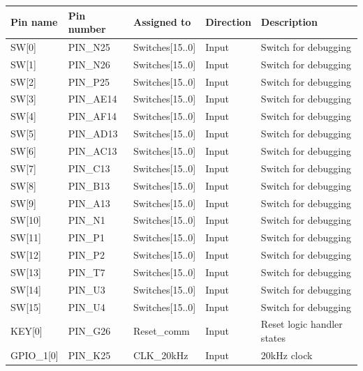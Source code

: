 \begin{table}[H]
	\begin{tabular}{|l|l|l|l|l|}
    	\hline
    	\textbf{Pin name} 	& \textbf{Pin number}& \textbf{Assigned to} 		&  \textbf{Direction} 	 & \textbf{Description} \\ \hline
    	SW[0]    	& PIN\_N25 	& Switches[15..0] 	& Input        	 & Switch for debugging           \\ \hline
    	SW[1]    	& PIN\_N26 	& Switches[15..0] 	& Input     	 & Switch for debugging    \\ \hline
    	SW[2]	 	& PIN\_P25 	& Switches[15..0] 	& Input			 & Switch for debugging  \\ \hline
    	SW[3]	 	& PIN\_AE14 & Switches[15..0] 	& Input			 & Switch for debugging \\ \hline
    	SW[4]	 	& PIN\_AF14 & Switches[15..0] 	& Input			 & Switch for debugging \\ \hline
    	SW[5]	 	& PIN\_AD13 & Switches[15..0] 	& Input			 & Switch for debugging           \\ \hline
    	SW[6]	 	& PIN\_AC13 & Switches[15..0] 	& Input			 & Switch for debugging           \\ \hline
    	SW[7]	 	& PIN\_C13 	& Switches[15..0] 	& Input			 & Switch for debugging		\\ \hline
    	SW[8]	 	& PIN\_B13 	& Switches[15..0] 	& Input			 & Switch for debugging		\\ \hline
   		SW[9]	 	& PIN\_A13 	& Switches[15..0] 	& Input			 & Switch for debugging \\ \hline
   		SW[10]	 	& PIN\_N1 	& Switches[15..0] 	& Input			 & Switch for debugging \\ \hline
   		SW[11]	 	& PIN\_P1 	& Switches[15..0] 	& Input			 & Switch for debugging \\ \hline
   		SW[12]	 	& PIN\_P2 	& Switches[15..0] 	& Input			 & Switch for debugging \\ \hline
   		SW[13]	 	& PIN\_T7 	& Switches[15..0] 	& Input			 & Switch for debugging \\ \hline
   		SW[14]	 	& PIN\_U3 	& Switches[15..0] 	& Input			 & Switch for debugging \\ \hline
   		SW[15]	 	& PIN\_U4 	& Switches[15..0] 	& Input			 & Switch for debugging \\ \hline
   		KEY[0]	 	& PIN\_G26 	& Reset\_comm 		& Input			 & Reset logic handler states \\ \hline
   		GPIO\_1[0]	& PIN\_K25 	& CLK\_20kHz 		& Input			 & 20kHz clock \\ \hline

\end{tabular}
\end{table}
